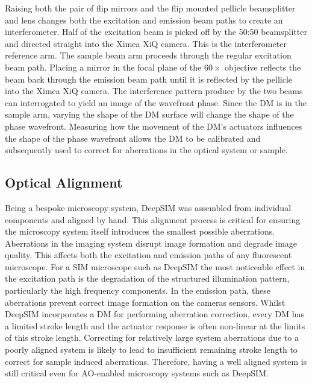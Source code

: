 Raising both the  pair of flip mirrors and the  flip mounted pellicle beamsplitter and lens changes both the excitation and emission beam paths to create an interferometer. Half of the excitation beam is picked off by the 50:50 beamsplitter and directed straight into the Ximea XiQ camera. This is the interferometer reference arm. The sample beam arm proceeds through the regular excitation beam path. Placing a mirror in the focal plane of the $60\times$ objective reflects the beam back through the emission beam path until it is reflected by the pellicle into the Ximea XiQ camera. The interference pattern produce by the two beams can interrogated to yield an image of the wavefront phase. Since the DM is in the sample arm, varying the shape of the DM surface will change the shape of the phase wavefront. Measuring how the movement of the DM's actuators influences the shape of the phase wavefront allows the DM to be calibrated and subsequently used to correct for aberrations in the optical system or sample. 

\subsection{Optical Alignment}
\label{subsec:alignment}

Being a bespoke microscopy system, DeepSIM was assembled from individual components and aligned by hand. This alignment process is critical for ensuring the microscopy system itself introduces the smallest possible aberrations. Aberrations in the imaging system disrupt image formation and degrade image quality.\cite{wyant1992basic} This affects both the excitation and emission paths of any fluorescent microscope. For a SIM microscope such as DeepSIM the most noticeable effect in the excitation path is the degradation of the structured illumination pattern, particularly the high frequency components.\cite{debarre2008adaptive,booth2015aberrations} In the emission path, these aberrations prevent correct image formation on the cameras sensors. Whilst DeepSIM incorporates a DM for performing aberration correction, every DM has a limited stroke length and the actuator response is often non-linear at the limits of this stroke length. Correcting for relatively large system aberrations due to a poorly aligned system is likely to lead to insufficient remaining stroke length to correct for sample induced aberrations. Therefore, having a well aligned system is still critical even for AO-enabled microscopy systems such as DeepSIM.

